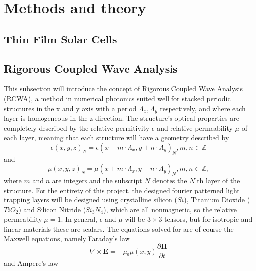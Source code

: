 \chapter{Methods and theory}
\label{sec:methods}
\section{Thin Film Solar Cells}
\section{Rigorous Coupled Wave Analysis}
\label{classical_solvers}
This subsection will introduce the concept of Rigorous Coupled Wave Analysis (RCWA), a method in numerical photonics suited well
for stacked periodic structures in the x and y axis with a period $\Lambda_x,\Lambda_y$ respectively, and where each layer is homogeneous in the z-direction\cite{torcwa}.
The structure's optical properties are completely described by the relative permitivity $\epsilon$ and relative permeability $\mu$ of each layer, meaning that each structure
will have a geometry described by
\begin{equation}
\label{eq:permittivity_periodicity}
\epsilon(x,y,z)_N = \epsilon(x + m \cdot \Lambda_x, y + n \cdot \Lambda_y)_N, m,n \in \mathbb{Z}
\end{equation}
and 
\begin{equation}
\label{eq:permeability_periodicity}
\mu(x,y,z)_N = \mu(x + m \cdot \Lambda_x, y + n \cdot \Lambda_y)_N, m,n \in \mathbb{Z},
\end{equation}
where $m$ and $n$ are integers and the subscript $N$ denotes the $N$'th layer of the structure. For the entirety of this project, the designed
fourier patterned light trapping layers will be designed using crystalline silicon ($Si$), Titanium Dioxide ($TiO_2$) and Silicon Nitride ($Si_3N_4$), which
are all nonmagnetic, so the relative permeability $\mu = 1$. In general, $\epsilon$ and $\mu$ will be $3 \times 3$ tensors, but for isotropic and linear materials these are scalars.
The equations solved for are of course the Maxwell equations, namely Faraday's law
\begin{equation}
\label{eq:faraday}
\nabla \times \mathbf{E} = -\mu_0\mu(x,y)\frac{\partial\mathbf{H}}{\partial t}
\end{equation}
and Ampere's law
